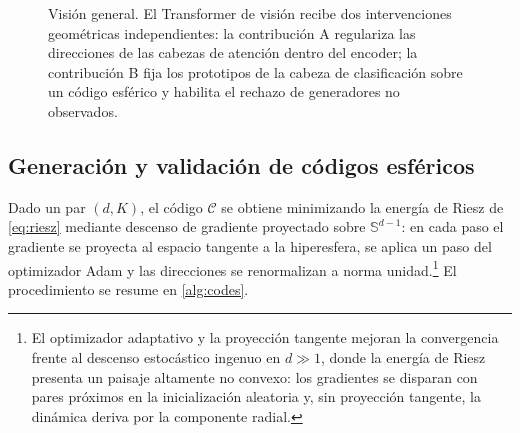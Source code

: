 \documentclass[11pt,a4paper]{article}
\theoremstyle{plain}
\newcommand{\Sph}{\mathbb{S}}
\begin{document}
\begin{figure}[t]
\centering
{}
\caption{Visión general. El Transformer de visión recibe dos
intervenciones geométricas independientes: la contribución A regulariza
las direcciones de las cabezas de atención dentro del encoder; la
contribución B fija los prototipos de la cabeza de clasificación sobre
un código esférico y habilita el rechazo de generadores no observados.}
\label{fig:overview}
\end{figure}

\subsection{Generación y validación de códigos esféricos}
\label{sec:metcodes}

Dado un par $(d,K)$, el código $\mathcal{C}$ se obtiene minimizando la
energía de Riesz de \cref{eq:riesz} mediante descenso de gradiente
proyectado sobre $\Sph^{d-1}$: en cada paso el gradiente se proyecta al
espacio tangente a la hiperesfera, se aplica un paso del optimizador
Adam y las direcciones se renormalizan a norma unidad.\footnote{El
optimizador adaptativo y la proyección tangente mejoran la convergencia
frente al descenso estocástico ingenuo en $d\gg 1$, donde la energía de
Riesz presenta un paisaje altamente no convexo: los gradientes se
disparan con pares próximos en la inicialización aleatoria y, sin
proyección tangente, la dinámica deriva por la componente radial.} El
procedimiento se resume en \cref{alg:codes}.
\end{document}
